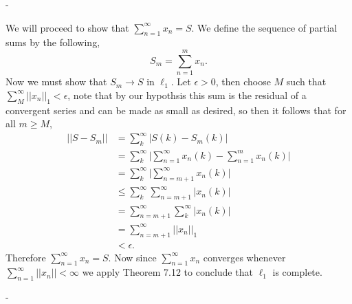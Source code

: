 \documentclass[12pt]{article}
\makeatletter
\theoremstyle{ex215}
\newcounter{probcount}
\newlength\probsep
\newlength\pshrinking
\newenvironment{problems}%
  {\ifhmode\unskip\par\fi\setcounter{probcount}{0}\probsep\parskip
  \sbox\@tempboxa{\textbf{9.}}\pshrinking\wd\@tempboxa\advance\pshrinking\labelsep
  \advance\linewidth -\pshrinking
  \advance\@totalleftmargin\pshrinking
  \advance\leftskip\pshrinking}%
  {\ifhmode\unskip \par\fi\advance\leftskip-\pshrinking}%
\renewenvironment{proof}[1][\proofname]{\par
  \pushQED{\qed}%
  \normalfont \topsep6\p@\@plus6\p@\relax
  \trivlist
  \@topsep \topsep
  \item[\hskip\labelsep
        \itshape
    #1\@addpunct{.}]\ignorespaces
}{%
  \popQED\endtrivlist\@endpefalse
}
\makeatother
\begin{document}
\begin{problems}
\begin{proof}
  We will proceed to show that $\sum_{n = 1}^{\infty}x_n = S$. We define the sequence of partial sums by the following, 
  \begin{equation*}
    S_m = \sum_{n = 1}^m x_n.
  \end{equation*}
  Now we must show that $S_m \to S$ in $\ell_1$. Let $\epsilon > 0$, then choose $M$ such that $\sum_{M}^{\infty} ||x_n||_1 < \epsilon$, note that by our hypothsis this sum is the residual of a convergent series and can be made as small as desired, so then it follows that for all $m \geq M$,
  \begin{align*}
    ||S - S_m || &= \sum_{k}^\infty |S(k) - S_m(k)|\\
    &=\sum_{k}^\infty \lvert\sum_{n = 1}^{\infty} x_n(k) - \sum_{n = 1}^m x_n(k)\rvert \\
    &=\sum_{k}^\infty \lvert \sum_{n = m+1}^{\infty} x_n(k)\rvert\\
    &\leq \sum_{k}^\infty \sum_{n = m+1}^{\infty} |x_n(k)|\\
    &= \sum_{n = m+1}^{\infty} \sum_{k}^\infty |x_n(k)|\\
    &= \sum_{n = m+1}^{\infty} ||x_n||_1\\
    &< \epsilon.
  \end{align*} 
  Therefore $\sum_{n = 1}^{\infty}x_n = S$. Now since $\sum_{n = 1}^{\infty}x_n$ converges whenever $\sum_{n = 1}^{\infty}||x_n|| < \infty$ we apply Theorem 7.12 to conclude that $\ell_1$ is complete. 


  
\end{proof}
\vspace*{.15in}





\end{problems}
\end{document}
